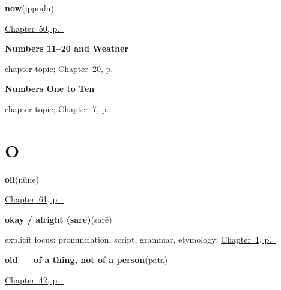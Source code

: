 \noindent\begin{minipage}[t]{\linewidth}
\raggedright
\textbf{now}\enspace\emph{}\enspace(ippuḍu)\par
\footnotesize \hyperref[ch:te-leave-more]{Chapter~50, p.~\pageref*{ch:te-leave-more}}
\end{minipage}\par\smallskip

\noindent\begin{minipage}[t]{\linewidth}
\raggedright
\textbf{Numbers 11–20 and Weather}\par
\footnotesize chapter topic; \hyperref[ch:te-numbers-and-weather]{Chapter~20, p.~\pageref*{ch:te-numbers-and-weather}}
\end{minipage}\par\smallskip

\noindent\begin{minipage}[t]{\linewidth}
\raggedright
\textbf{Numbers One to Ten}\par
\footnotesize chapter topic; \hyperref[ch:te-numbers-one-to-ten]{Chapter~7, p.~\pageref*{ch:te-numbers-one-to-ten}}
\end{minipage}\par\smallskip

\section*{O}

\noindent\begin{minipage}[t]{\linewidth}
\raggedright
\textbf{oil}\enspace\emph{}\enspace(nūne)\par
\footnotesize \hyperref[ch:te-kitchen]{Chapter~61, p.~\pageref*{ch:te-kitchen}}
\end{minipage}\par\smallskip

\noindent\begin{minipage}[t]{\linewidth}
\raggedright
\textbf{okay / alright (sarē)}\enspace\emph{}\enspace(sarē)\par
\footnotesize explicit focus: pronunciation, script, grammar, etymology; \hyperref[ch:greetings]{Chapter~1, p.~\pageref*{ch:greetings}}
\end{minipage}\par\smallskip

\noindent\begin{minipage}[t]{\linewidth}
\raggedright
\textbf{old — of a thing, not of a person}\enspace\emph{}\enspace(pāta)\par
\footnotesize \hyperref[ch:te-describing-things]{Chapter~42, p.~\pageref*{ch:te-describing-things}}
\end{minipage}\par\smallskip

